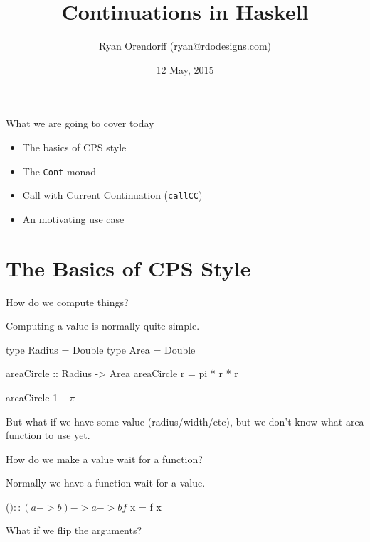 \documentclass[ignorenonframetext,]{beamer}
\title{Continuations in Haskell}
\author{Ryan Orendorff (ryan@rdodesigns.com)}
\date{12 May, 2015}
\begin{document}
\frame{\titlepage}

\begin{frame}{What we are going to cover today}

\begin{itemize}
\itemsep1pt\parskip0pt
\item
  The basics of CPS style
\item
  The \texttt{Cont} monad
\item
  Call with Current Continuation (\texttt{callCC})
\item
  An motivating use case
\end{itemize}

\long{}

\end{frame}

\section{The Basics of CPS Style}\label{the-basics-of-cps-style}

\begin{frame}[fragile]{How do we compute things?}

Computing a value is normally quite simple.

\begin{haskellcode}
type Radius = Double
type Area = Double

areaCircle :: Radius -> Area
areaCircle r = pi * r * r
\end{haskellcode}

\begin{haskellcode}
areaCircle 1 -- $\pi$
\end{haskellcode}

\pause

But what if we have some value (radius/width/etc), but we don't know
what area function to use yet.

\end{frame}

\begin{frame}[fragile]{How do we make a value wait for a function?}

Normally we have a function wait for a value.

\begin{haskellcode}
($) :: (a -> b) -> a -> b
f $ x = f x
\end{haskellcode}

\pause

What if we flip the arguments?


\end{frame}
\end{document}
